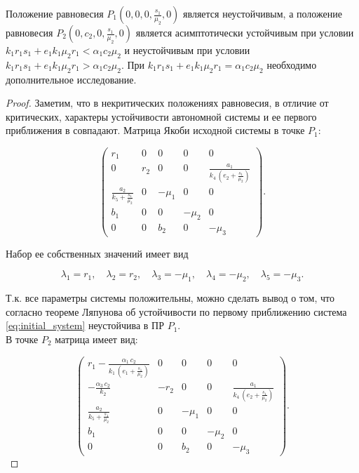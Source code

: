 \documentclass[14pt,a4paper]{extarticle}
\begin{document}
	\begin{theorem}
		Положение равновесия $P_1\left(0,0,0,\frac{s_1}{\mu_2},0\right)$ является неустойчивым, а положение равновесия $P_2\left(0,c_2,0,\frac{s_1}{\mu_2},0\right)$ является асимптотически устойчивым при условии $k_1r_1s_1 + e_1k_1\mu_2r_1< \alpha_1c_2\mu_2$ и неустойчивым при условии $k_1r_1s_1 + e_1k_1\mu_2r_1>\alpha_1c_2\mu_2$. При $k_1r_1s_1 + e_1k_1\mu_2r_1 = \alpha_1c_2\mu_2$ необходимо дополнительное исследование.
	\end{theorem}
	\begin{proof}
		Заметим, что в некритических положениях равновесия, в отличие от критических, характеры устойчивости автономной системы и ее первого приближения в совпадают.
		\newpage
		Матрица Якоби исходной системы в точке $P_1$:
		
		\[\begin{pmatrix}
			r_{1} & 0 & 0 & 0 & 0\\ 
			0 & r_{2} & 0 & 0 & \frac{a_{1}}{k_{4}\,\left(e_{2}+\frac{s_{1}}{\mu _{2}}\right)}\\ 
			\frac{a_{2}}{k_{5}+\frac{s_{1}}{\mu _{2}}} & 0 & -\mu _{1} & 0 & 0\\ 
			b_{1} & 0 & 0 & -\mu _{2} & 0\\ 
			0 & 0 & b_{2} & 0 & -\mu _{3} 
		\end{pmatrix}.\]
		
		Набор ее собственных значений имеет вид
		
		\[\lambda_1=r_1,\quad \lambda_2=r_2,\quad \lambda_3=-\mu_1,\quad \lambda_4=-\mu_2,\quad \lambda_5=-\mu_3.\]
		
		Т.к. все параметры системы положительны, можно сделать вывод о том, что согласно теореме Ляпунова об устойчивости по первому приближению система \ref{eq:initial_system} неустойчива в ПР $P_1$.\\
		В точке $P_2$ матрица имеет вид:
		
		\[\begin{pmatrix}
			r_{1}-\frac{\alpha _{1}\,c_{2}}{k_{1}\,\left(e_{1}+\frac{s_{1}}{\mu _{2}}\right)} & 0 & 0 & 0 & 0\\ 
			-\frac{\alpha _{3}\,c_{2}}{k_{2}} & -r_{2} & 0 & 0 & \frac{a_{1}}{k_{4}\,\left(e_{2}+\frac{s_{1}}{\mu _{2}}\right)}\\ 
			\frac{a_{2}}{k_{5}+\frac{s_{1}}{\mu _{2}}} & 0 & -\mu _{1} & 0 & 0\\ 
			b_{1} & 0 & 0 & -\mu _{2} & 0\\ 
			0 & 0 & b_{2} & 0 & -\mu _{3}
		\end{pmatrix}.\]
		

\end{proof}
\end{document}
